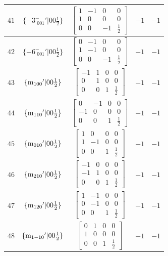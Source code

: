 \documentclass[fleqn,8pt]{jsarticle}
\begin{document}
\begin{longtable}{ccccc}
$ 41 $ & $ \{-3^{-}_{\,\,001}{}'|0 0 \frac{1}{2}\} $ & $ \begin{bmatrix} 1 & -1 & 0 & 0 \\ 1 & 0 & 0 & 0 \\ 0 & 0 & -1 & \frac{1}{2} \end{bmatrix} $ & $ -1 $ & $ -1 $ \\ \hline
$ 42 $ & $ \{-6^{-}_{\,\,001}{}'|0 0 \frac{1}{2}\} $ & $ \begin{bmatrix} 0 & -1 & 0 & 0 \\ 1 & -1 & 0 & 0 \\ 0 & 0 & -1 & \frac{1}{2} \end{bmatrix} $ & $ -1 $ & $ -1 $ \\ \hline
$ 43 $ & $ \{{\rm m}_{100}{}'|0 0 \frac{1}{2}\} $ & $ \begin{bmatrix} -1 & 1 & 0 & 0 \\ 0 & 1 & 0 & 0 \\ 0 & 0 & 1 & \frac{1}{2} \end{bmatrix} $ & $ -1 $ & $ -1 $ \\ \hline
$ 44 $ & $ \{{\rm m}_{110}{}'|0 0 \frac{1}{2}\} $ & $ \begin{bmatrix} 0 & -1 & 0 & 0 \\ -1 & 0 & 0 & 0 \\ 0 & 0 & 1 & \frac{1}{2} \end{bmatrix} $ & $ -1 $ & $ -1 $ \\ \hline
$ 45 $ & $ \{{\rm m}_{010}{}'|0 0 \frac{1}{2}\} $ & $ \begin{bmatrix} 1 & 0 & 0 & 0 \\ 1 & -1 & 0 & 0 \\ 0 & 0 & 1 & \frac{1}{2} \end{bmatrix} $ & $ -1 $ & $ -1 $ \\ \hline
$ 46 $ & $ \{{\rm m}_{210}{}'|0 0 \frac{1}{2}\} $ & $ \begin{bmatrix} -1 & 0 & 0 & 0 \\ -1 & 1 & 0 & 0 \\ 0 & 0 & 1 & \frac{1}{2} \end{bmatrix} $ & $ -1 $ & $ -1 $ \\ \hline
$ 47 $ & $ \{{\rm m}_{120}{}'|0 0 \frac{1}{2}\} $ & $ \begin{bmatrix} 1 & -1 & 0 & 0 \\ 0 & -1 & 0 & 0 \\ 0 & 0 & 1 & \frac{1}{2} \end{bmatrix} $ & $ -1 $ & $ -1 $ \\ \hline
$ 48 $ & $ \{{\rm m}_{1-10}{}'|0 0 \frac{1}{2}\} $ & $ \begin{bmatrix} 0 & 1 & 0 & 0 \\ 1 & 0 & 0 & 0 \\ 0 & 0 & 1 & \frac{1}{2} \end{bmatrix} $ & $ -1 $ & $ -1 $ \\
\end{longtable}
\end{document}
